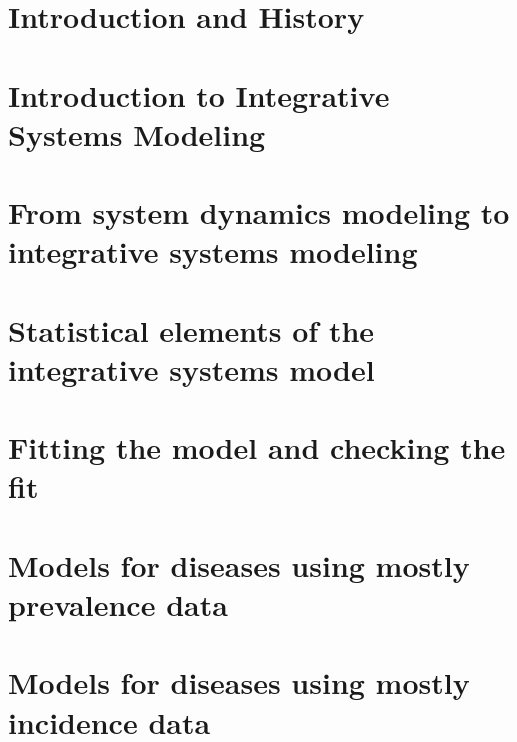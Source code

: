\chapter[Introduction]{Introduction and History}
\label{chapter:introduction}






\chapter[Introduction to ISM]{Introduction to Integrative Systems Modeling}
\label{chapter:theory-introduction}


\chapter[System dynamics model]{From system dynamics modeling to integrative systems modeling}
\label{chapter:system-dynamics}



\chapter[Statistical model]{Statistical elements of the integrative systems model}
\label{chapter:statistical-model}





\chapter[Model fitting]{Fitting the model and checking the fit}
\label{chapter:model-fitting}






\chapter[Mostly Prevalence]{Models for diseases using mostly prevalence data}
\label{chapter:practice-mostly_prevalence}


\chapter[Mostly Incidence]{Models for diseases using mostly incidence data}
\label{chapter:practice-mostly_incidence}


